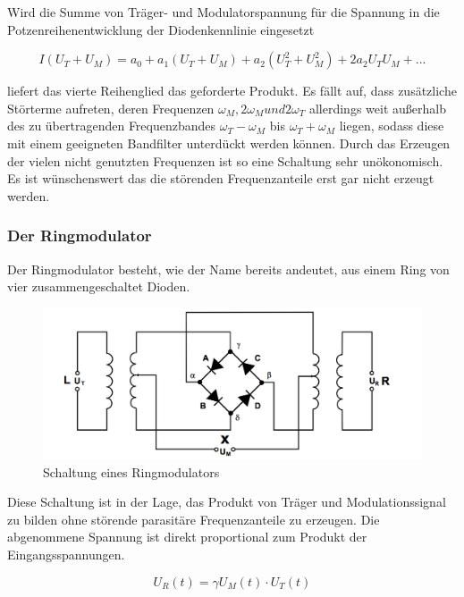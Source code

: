 Wird die Summe von Träger- und Modulatorspannung für die Spannung in die Potzenreihenentwicklung der Diodenkennlinie eingesetzt

\begin{equation}
I(U_T + U_M) = a_0 + a_1(U_T + U_M) + a_2(U_T^2 + U_M^2) + 2a_2 U_T U_M + ...
\end{equation}

liefert das vierte Reihenglied das geforderte Produkt. Es fällt auf, dass zusätzliche Störterme aufreten, deren Frequenzen  $\omega_M, 2\omega_M und 2\omega_T$ allerdings weit außerhalb des zu übertragenden Frequenzbandes $\omega_T - \omega_M$ bis $\omega_T + \omega_M$ liegen, sodass diese mit einem geeigneten Bandfilter unterdückt werden können.
Durch das Erzeugen der vielen nicht genutzten Frequenzen ist so eine Schaltung sehr unökonomisch. Es ist wünschenswert das die störenden Frequenzanteile erst gar nicht erzeugt werden.

\subsubsection{Der Ringmodulator}
Der Ringmodulator besteht, wie der Name bereits andeutet, aus einem Ring von vier zusammengeschaltet Dioden.

\begin{figure}
	\centering
	\includegraphics[width=\textwidth]{img/Abb5.png}
	\caption{Schaltung eines Ringmodulators \cite{FP}}
	\label{abb:ringMod}
\end{figure}

Diese Schaltung ist in der Lage, das Produkt von Träger und Modulationssignal zu bilden ohne störende parasitäre Frequenzanteile zu erzeugen. Die abgenommene Spannung ist direkt proportional zum Produkt der Eingangsspannungen.

\begin{equation}
U_R(t) = \gamma U_M(t) \cdot U_T(t)
\label{eq:ringMod}
\end{equation}

